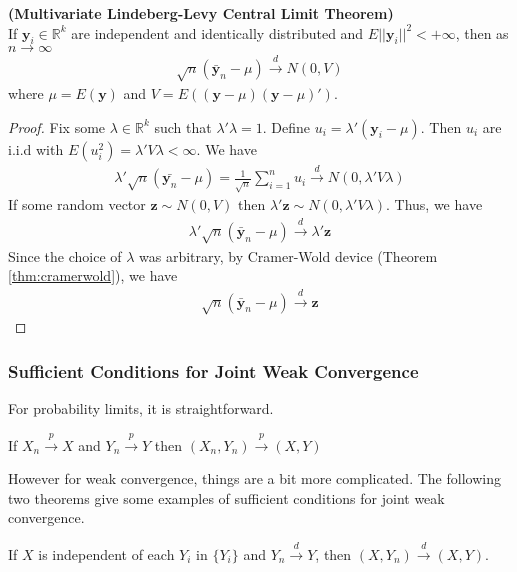 \documentclass[11pt]{article} %
\theoremstyle{definition}
\numberwithin{defn}{subsection}
\numberwithin{thm}{subsection}
\numberwithin{ex}{subsection}
\newcommand{\bb}[1]{\mathbb{#1}}
\newcommand{\R}{\bb{R}}
\newcommand{\plim}{\overset{p}{\rightarrow}}
\newcommand{\dlim}{\overset{d}{\rightarrow}}
\newcommand{\sumi}{\sum_{i=1}^n}
\newcommand{\ninfty}{n\rightarrow\infty}
\begin{document}
\begin{thm}\label{thm:clt(vector)}
	\textbf{(Multivariate Lindeberg-Levy Central Limit Theorem)}	\\
	If $\bm{y}_i\in\R^k$ are independent and identically distributed and $E||\bm{y}_i||^2<+\infty$, then as $\ninfty$
	\begin{align*}
	\sqrt{n}(\bar{\bm{y}}_n-\mu)\dlim N(0,V)
	\end{align*}
	where $\mu=E(\bm{y})$ and $V=E((\bm{y}-\mu)(\bm{y}-\mu)')$.
	\begin{proof}
		Fix some $\lambda\in \R^k$ such that $\lambda'\lambda=1$. Define $u_i=\lambda'(\bm{y}_i-\mu)$. Then $u_i$ are i.i.d with $E(u_i^2)=\lambda'V\lambda<\infty$. We have
		\begin{align*}
		\lambda'\sqrt{n}(\bar{\bm{y}_n}-\mu)=\frac{1}{\sqrt{n}}\sumi u_i\dlim N(0,\lambda'V\lambda)
		\end{align*}
		If some random vector $\bm{z}\sim N(0,V)$ then $\lambda' \bm{z}\sim N(0,\lambda'V\lambda)$. Thus, we have
		\begin{align*}
		\lambda'\sqrt{n}(\bar{\bm{y}}_n-\mu)\dlim \lambda' \bm{z}
		\end{align*}
		Since the choice of $\lambda$ was arbitrary, by Cramer-Wold device (Theorem \ref{thm:cramerwold}), we have
		\begin{align*}
		\sqrt{n}(\bar{\bm{y}}_n-\mu)\dlim\bm{z}
		\end{align*}
	\end{proof}
\end{thm}

\subsubsection{Sufficient Conditions for Joint Weak Convergence}
For probability limits, it is straightforward.
\begin{thm}
	If $X_n\plim X$ and $Y_n\plim Y$ then $(X_n,Y_n)\plim (X,Y)$	
\end{thm}
However for weak convergence, things are a bit more complicated. The following two theorems give some examples of sufficient conditions for joint weak convergence.
\begin{thm}
	If $X$ is independent of each $Y_i$ in $\{Y_i\}$ and $Y_n\dlim Y$, then $(X,Y_n)\dlim (X,Y)$.
\end{thm}
\end{document}
